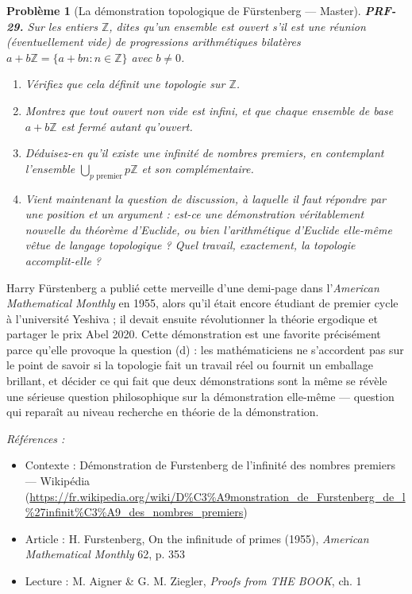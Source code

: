 \documentclass[11pt]{article}
\newtheorem{problem}{Problème}
\newenvironment{refs}{\par\small\noindent\emph{Références :}\begin{itemize}\setlength\itemsep{0pt}}{\end{itemize}\normalsize}
\begin{document}
\bigskip

\begin{problem}[{La démonstration topologique de Fürstenberg --- Master}]
\textbf{PRF-29.} Sur les entiers $\mathbb{Z}$, dites qu'un ensemble est ouvert s'il est une
réunion (éventuellement vide) de progressions arithmétiques bilatères
$ a + b\mathbb{Z} = \{ a + bn : n \in \mathbb{Z} \} $ avec $ b \ne 0 $.
\begin{enumerate}
\item[(a)] Vérifiez que cela définit une topologie sur $\mathbb{Z}$.
\item[(b)] Montrez que tout ouvert non vide est
infini, et que chaque ensemble de base $ a + b\mathbb{Z} $ est fermé autant qu'ouvert.
\item[(c)] Déduisez-en qu'il existe une infinité de nombres premiers, en contemplant l'ensemble
$ \bigcup_{p \text{ premier}} p\mathbb{Z} $ et son complémentaire.
\item[(d)] Vient maintenant la question de
discussion, à laquelle il faut répondre par une position et un argument : est-ce une
démonstration véritablement nouvelle du théorème d'Euclide, ou bien l'arithmétique d'Euclide
elle-même vêtue de langage topologique ? Quel travail, exactement, la topologie
accomplit-elle ?
\end{enumerate}

\end{problem}

\noindent Harry Fürstenberg a publié cette merveille d'une demi-page dans l'\textit{American
Mathematical Monthly} en 1955, alors qu'il était encore étudiant de premier cycle à
l'université Yeshiva ; il devait ensuite révolutionner la théorie ergodique et partager le
prix Abel 2020. Cette démonstration est une favorite précisément parce qu'elle provoque la
question (d) : les mathématiciens ne s'accordent pas sur le point de savoir si la topologie
fait un travail réel ou fournit un emballage brillant, et décider ce qui fait que deux
démonstrations sont \og{} la même \fg{} se révèle une sérieuse question philosophique sur la
démonstration elle-même --- question qui reparaît au niveau recherche en théorie de la
démonstration.

\begin{refs}
\item Contexte : Démonstration de Furstenberg de l'infinité des nombres premiers --- Wikipédia (\url{https://fr.wikipedia.org/wiki/D%C3%A9monstration_de_Furstenberg_de_l%27infinit%C3%A9_des_nombres_premiers})
\item Article : H. Furstenberg, \og{} On the infinitude of primes \fg{} (1955), \textit{American Mathematical Monthly} 62, p. 353
\item Lecture : M. Aigner \& G. M. Ziegler, \textit{Proofs from THE BOOK}, ch. 1
\end{refs}
\end{document}
